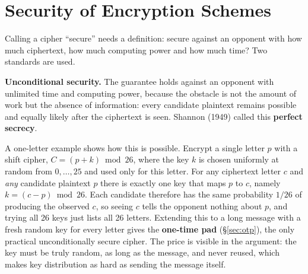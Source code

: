 \section{Security of Encryption Schemes}\label{sec:schemes}

Calling a cipher ``secure'' needs a definition: secure against an opponent with how much ciphertext, how much computing power and how much time? Two standards are used.

\textbf{Unconditional security.}  The guarantee holds against an opponent with unlimited time and computing power, because the obstacle is not the amount of work but the absence of information: every candidate plaintext remains possible and equally likely after the ciphertext is seen. Shannon (1949) called this \textbf{perfect secrecy}.

A one-letter example shows how this is possible. Encrypt a single letter $p$ with a shift cipher, $C = (p + k) \bmod 26$, where the key $k$ is chosen uniformly at random from $0, \dots, 25$ and used only for this letter. For any ciphertext letter $c$ and \emph{any} candidate plaintext $p$ there is exactly one key that maps $p$ to $c$, namely $k = (c - p) \bmod 26$. Each candidate therefore has the same probability $1/26$ of producing the observed $c$, so seeing $c$ tells the opponent nothing about $p$, and trying all 26 keys just lists all 26 letters. Extending this to a long message with a fresh random key for every letter gives the \textbf{one-time pad} (\S\ref{sec:otp}), the only practical unconditionally secure cipher. The price is visible in the argument: the key must be truly random, as long as the message, and never reused, which makes key distribution as hard as sending the message itself.

